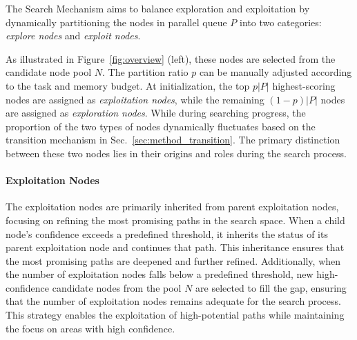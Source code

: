 The Search Mechanism aims to balance exploration and exploitation by dynamically partitioning the nodes in parallel queue \( P \) into two categories: \textit{explore nodes} and \textit{exploit nodes}. 

As illustrated in Figure~\ref{fig:overview} (left), these nodes are selected from the candidate node pool \( N \).
The partition ratio $p$ can be manually adjusted according to the task and memory budget. 
At initialization, the top \( p|P| \) highest-scoring nodes are assigned as \textit{exploitation nodes}, while the remaining \( (1 - p)|P| \) nodes are assigned as \textit{exploration nodes}. While during searching progress, the proportion of the two types of nodes dynamically fluctuates based on the transition mechanism in Sec.~\ref{sec:method_transition}. 
The primary distinction between these two nodes lies in their origins and roles during the search process.

\paragraph{Exploitation Nodes} 
 The exploitation nodes are primarily inherited from parent exploitation nodes, focusing on refining the most promising paths in the search space. When a child node’s confidence exceeds a predefined threshold, it inherits the status of its parent exploitation node and continues that path. This inheritance ensures that the most promising paths are deepened and further refined. Additionally, when the number of exploitation nodes falls below a predefined threshold, new high-confidence candidate nodes from the pool \( N \) are selected to fill the gap, ensuring that the number of exploitation nodes remains adequate for the search process. This strategy enables the exploitation of high-potential paths while maintaining the focus on areas with high confidence.

